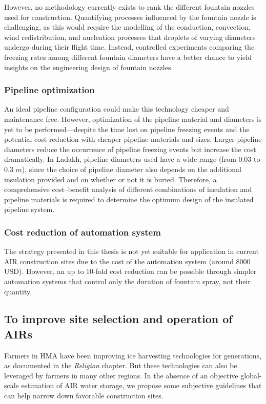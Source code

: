 However, no methodology currently exists to rank the different fountain nozzles used for construction. Quantifying
processes influenced by the fountain nozzle is challenging, as this would require the modelling of the conduction,
convection, wind redistribution, and nucleation processes that droplets of varying diameters undergo during
their flight time. Instead, controlled experiments comparing the freezing rates among different fountain
diameters have a better chance to yield insights on the engineering design of fountain nozzles.

\subsubsection{Pipeline optimization}

An ideal pipeline configuration could make this technology cheaper and maintenance free. However, optimization
of the pipeline material and diameters is yet to be performed---despite the time lost on pipeline freezing
events and the potential cost reduction with cheaper pipeline materials and sizes. Larger pipeline diameters
reduce the occurrence of pipeline freezing events but increase the cost dramatically. In Ladakh, pipeline
diameters used have a wide range (from 0.03 to 0.3 $m$), since the choice of pipeline diameter also depends on
the additional insulation provided and on whether or not it is buried. Therefore, a comprehensive cost--benefit
analysis of different combinations of insulation and pipeline materials is required to determine the optimum
design of the insulated pipeline system.

\subsubsection{Cost reduction of automation system}

The strategy presented in this thesis is not yet suitable for application in current \ac{AIR} construction sites
due to the cost of the automation system (around 8000 USD). However, an up to 10-fold cost reduction can be
possible through simpler automation systems that control only the duration of fountain spray, not their
quantity. 

\subsection{To improve site selection and operation of AIRs }

Farmers in \ac{HMA} have been improving ice harvesting technologies for generations, as documented in the
\textit{Religion} chapter. But these technologies can also be leveraged by farmers in many other regions. In the
absence of an objective global-scale estimation of \ac{AIR} water storage, we propose some subjective guidelines
that can help narrow down favorable construction sites.

